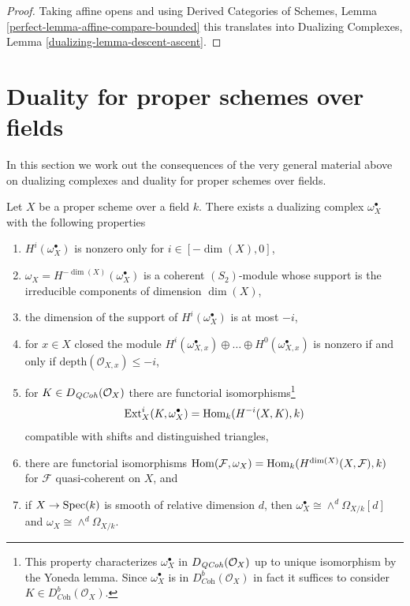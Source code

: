 \begin{proof}
Taking affine opens and using
Derived Categories of Schemes, Lemma \ref{perfect-lemma-affine-compare-bounded}
this translates into
Dualizing Complexes, Lemma \ref{dualizing-lemma-descent-ascent}.
\end{proof}







\section{Duality for proper schemes over fields}
\label{section-duality-proper-over-field}

\noindent
In this section we work out the consequences of the very general
material above on dualizing complexes and duality for proper schemes
over fields.

\begin{lemma}
\label{lemma-duality-proper-over-field}
Let $X$ be a proper scheme over a field $k$. There exists a dualizing complex
$\omega_X^\bullet$ with the following properties
\begin{enumerate}
\item $H^i(\omega_X^\bullet)$ is nonzero only for $i \in [-\dim(X), 0]$,
\item $\omega_X = H^{-\dim(X)}(\omega_X^\bullet)$ is a coherent
$(S_2)$-module whose support is the irreducible components
of dimension $\dim(X)$,
\item the dimension of the support of $H^i(\omega_X^\bullet)$ is at most $-i$,
\item for $x \in X$ closed the module
$H^i(\omega_{X, x}^\bullet) \oplus \ldots \oplus H^0(\omega_{X, x}^\bullet)$
is nonzero if and only if $\text{depth}(\mathcal{O}_{X, x}) \leq -i$,
\item for $K \in D_{\mathit{QCoh}}(\mathcal{O}_X)$ there are functorial
isomorphisms\footnote{This property
characterizes $\omega_X^\bullet$ in $D_{\mathit{QCoh}}(\mathcal{O}_X)$
up to unique isomorphism by the Yoneda lemma. Since $\omega_X^\bullet$
is in $D^b_{\textit{Coh}}(\mathcal{O}_X)$ in fact it suffices to consider
$K \in D^b_{\textit{Coh}}(\mathcal{O}_X)$.}
$$
\mathop{\mathrm{Ext}}\nolimits^i_X(K, \omega_X^\bullet) = \mathop{\mathrm{Hom}}\nolimits_k(H^{-i}(X, K), k)
$$
compatible with shifts and distinguished triangles,
\item there are functorial isomorphisms
$\mathop{\mathrm{Hom}}\nolimits(\mathcal{F}, \omega_X) = \mathop{\mathrm{Hom}}\nolimits_k(H^{\dim(X)}(X, \mathcal{F}), k)$
for $\mathcal{F}$ quasi-coherent on $X$, and
\item if $X \to \mathop{\mathrm{Spec}}(k)$ is smooth of relative dimension $d$,
then $\omega_X^\bullet \cong \wedge^d\Omega_{X/k}[d]$ and
$\omega_X \cong \wedge^d\Omega_{X/k}$.
\end{enumerate}
\end{lemma}

